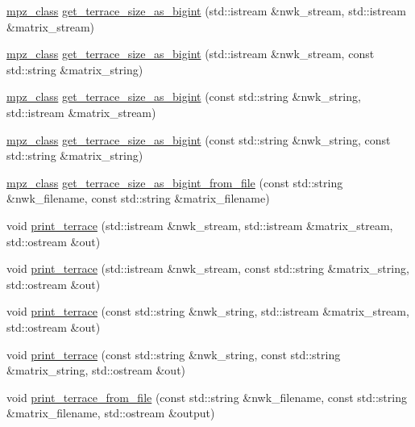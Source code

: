 \begin{DoxyCompactItemize}
\item 
\hyperlink{gmpxx_8h_a4194ba637e08ba88fb6b56747cc0ee6c}{mpz\+\_\+class} \hyperlink{namespaceterraces_aa5f247849fef83931db798d94f3d3208}{get\+\_\+terrace\+\_\+size\+\_\+as\+\_\+bigint} (std\+::istream \&nwk\+\_\+stream, std\+::istream \&matrix\+\_\+stream)
\item 
\hyperlink{gmpxx_8h_a4194ba637e08ba88fb6b56747cc0ee6c}{mpz\+\_\+class} \hyperlink{namespaceterraces_a52729af5c44841c718693508654a4852}{get\+\_\+terrace\+\_\+size\+\_\+as\+\_\+bigint} (std\+::istream \&nwk\+\_\+stream, const std\+::string \&matrix\+\_\+string)
\item 
\hyperlink{gmpxx_8h_a4194ba637e08ba88fb6b56747cc0ee6c}{mpz\+\_\+class} \hyperlink{namespaceterraces_acb1e910e11d185376512e68fa777c02c}{get\+\_\+terrace\+\_\+size\+\_\+as\+\_\+bigint} (const std\+::string \&nwk\+\_\+string, std\+::istream \&matrix\+\_\+stream)
\item 
\hyperlink{gmpxx_8h_a4194ba637e08ba88fb6b56747cc0ee6c}{mpz\+\_\+class} \hyperlink{namespaceterraces_a77a2041cec698021d4513fe8582295d2}{get\+\_\+terrace\+\_\+size\+\_\+as\+\_\+bigint} (const std\+::string \&nwk\+\_\+string, const std\+::string \&matrix\+\_\+string)
\item 
\hyperlink{gmpxx_8h_a4194ba637e08ba88fb6b56747cc0ee6c}{mpz\+\_\+class} \hyperlink{namespaceterraces_a2fd8367ac496d3302518b44ad2804e0a}{get\+\_\+terrace\+\_\+size\+\_\+as\+\_\+bigint\+\_\+from\+\_\+file} (const std\+::string \&nwk\+\_\+filename, const std\+::string \&matrix\+\_\+filename)
\item 
void \hyperlink{namespaceterraces_a8945b2604514ca878a2ba568029f1062}{print\+\_\+terrace} (std\+::istream \&nwk\+\_\+stream, std\+::istream \&matrix\+\_\+stream, std\+::ostream \&out)
\item 
void \hyperlink{namespaceterraces_ae35eb2f7d41b44f45b8bb1623f188fe3}{print\+\_\+terrace} (std\+::istream \&nwk\+\_\+stream, const std\+::string \&matrix\+\_\+string, std\+::ostream \&out)
\item 
void \hyperlink{namespaceterraces_a6b70762dab550c4b63c1fb12a976c79b}{print\+\_\+terrace} (const std\+::string \&nwk\+\_\+string, std\+::istream \&matrix\+\_\+stream, std\+::ostream \&out)
\item 
void \hyperlink{namespaceterraces_abc9fdae9cfcc6334ed6e3a965e0dbd41}{print\+\_\+terrace} (const std\+::string \&nwk\+\_\+string, const std\+::string \&matrix\+\_\+string, std\+::ostream \&out)
\item 
void \hyperlink{namespaceterraces_a8a1db74ca77db1dd2a23a92e8ff05e34}{print\+\_\+terrace\+\_\+from\+\_\+file} (const std\+::string \&nwk\+\_\+filename, const std\+::string \&matrix\+\_\+filename, std\+::ostream \&output)

\end{DoxyCompactItemize}
